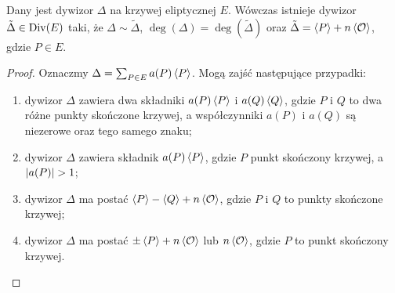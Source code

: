 \begin{theorem}\label{divisor_linear_reduction_theorem}
Dany jest dywizor $\Delta$ na krzywej eliptycznej $E$.
Wówczas istnieje dywizor $\tilde{\Delta} \in \operatorname{Div}(E)$ taki,
że $\Delta \sim \tilde{\Delta}$, $\deg(\Delta) = \deg(\tilde{\Delta})$
oraz $\tilde{\Delta} = \left\langle P\right\rangle + n\left\langle\mathcal{O}\right\rangle$,
gdzie $P \in E$.
\end{theorem}

\begin{proof}
Oznaczmy $\Delta = \sum_{P \in E}a(P)\left\langle P\right\rangle$.
Mogą zajść następujące przypadki:
\begin{enumerate}
\item dywizor $\Delta$ zawiera dwa składniki
$a(P)\left\langle P\right\rangle$ i $a(Q)\left\langle Q\right\rangle$,
gdzie $P$ i $Q$ to dwa różne punkty skończone krzywej,
a współczynniki $a(P)$ i $a(Q)$ są niezerowe oraz tego samego znaku;
\item dywizor $\Delta$ zawiera składnik $a(P)\left\langle P\right\rangle$,
gdzie $P$ punkt skończony krzywej, a $\lvert a(P)\rvert > 1$;
\item dywizor $\Delta$ ma postać $\left\langle P\right\rangle - \left\langle Q\right\rangle + n\left\langle\mathcal{O}\right\rangle$,
gdzie $P$ i $Q$ to punkty skończone krzywej;
\item dywizor $\Delta$ ma postać $\pm\left\langle P\right\rangle + n\left\langle\mathcal{O}\right\rangle$
lub $n\left\langle\mathcal{O}\right\rangle$,
gdzie $P$ to punkt skończony krzywej.
\end{enumerate}


\end{proof}

